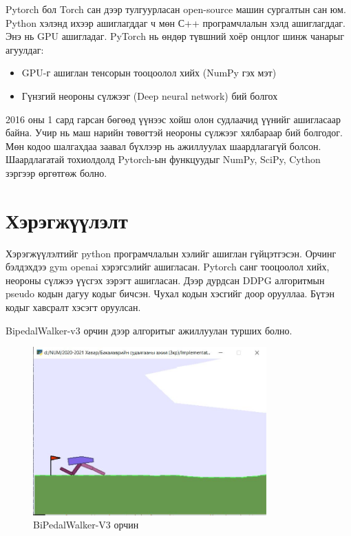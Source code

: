 \documentclass[12pt,A4]{report}
\begin{document}
Pytorch бол Torch сан дээр тулгуурласан open-source машин сургалтын сан юм. Python хэлэнд ихээр ашиглагддаг ч мөн С++ програмчлалын хэлд ашиглагддаг. Энэ нь GPU ашигладаг. PyTorch нь өндөр түвшний хоёр онцлог шинж чанарыг агуулдаг:

\begin{itemize}
	\item GPU-г ашиглан тенсорын тооцоолол хийх (NumPy гэх мэт) 
	\item Гүнзгий неороны сүлжээг (Deep neural network) бий болгох
\end{itemize}

2016 оны 1 сард гарсан бөгөөд үүнээс хойш олон судлаачид үүнийг ашигласаар байна. Учир нь маш нарийн төвөгтэй неороны сүлжээг хялбараар бий болгодог. Мөн кодоо шалгахдаа заавал бүхлээр нь ажиллуулах шаардлагагүй болсон. Шаардлагатай тохиолдолд Pytorch-ын функцуудыг NumPy, SciPy, Cython зэргээр өргөтгөж болно. 
 
\chapter{Хэрэгжүүлэлт}

Хэрэгжүүлэлтийг python програмчлалын хэлийг ашиглан гүйцэтгэсэн. Орчинг бэлдэхдээ gym openai хэрэгсэлийг ашигласан. Pytorch санг тооцоолол хийх, неороны сүлжээ үүсгэх зэрэгт ашигласан. Дээр дурдсан DDPG алгоритмын pseudo кодын дагуу кодыг бичсэн. Чухал кодын хэсгийг доор орууллаа. Бүтэн кодыг хавсралт хэсэгт оруулсан.

BipedalWalker-v3 орчин дээр алгоритыг ажиллуулан турших болно.

\begin{figure}[H]
\centering
\includegraphics[width=0.8\textwidth]{./images/bipedalwalker}
\caption{BiPedalWalker-V3 орчин}
\end{figure}
\end{document}
